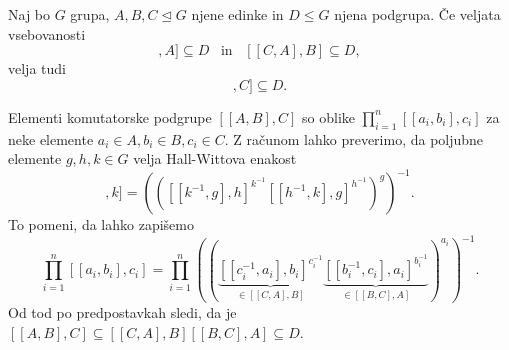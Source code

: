 \begin{lema}
\label{lem_tri_podgrupe}
Naj bo $G$ grupa, $A, B, C \trianglelefteq G$ njene edinke in $D \le G$ njena podgrupa. Če veljata vsebovanosti \begin{equation*}
[[B, C], A] \subseteq  D \,\,\, \text{ in } \,\,\, [[C, A], B]  \subseteq D,
\end{equation*}  
velja tudi \begin{equation*}
 [[A, B], C] \subseteq D.
\end{equation*}
\end{lema}
\begin{dokaz}
    Elementi komutatorske podgrupe $[[A, B], C]$ so oblike $\prod_{i = 1}^{n} [[a_i, b_i], c_i]$ za neke elemente $a_i \in A, b_{i} \in  B, c_{i} \in  C$. Z računom lahko preverimo, da poljubne elemente $g, h, k \in G$ velja Hall-Wittova enakost \begin{equation*}
[[g^{-1}, h], k] = \left(  \left(  [[k^{-1}, g], h]^{k^{-1}} [[h^{-1} , k] , g]^{h^{-1}} \right)^{g} \right)^{-1}.
\end{equation*}  
  To pomeni, da lahko zapišemo \begin{equation*}
    \prod_{i = 1}^{n} [[a_i, b_i], c_i]  = \prod_{i = 1}^{n} \left(  \left(  \underbrace{[[c_i^{-1}, a_i], b_i]^{c_i^{-1}}}_{\in [[C, A], B]}  \underbrace{[[b_i^{-1} , c_i] , a_i]^{b_i^{-1}}}_{\in [[B, C], A]}  \right)^{a_i} \right)^{-1}.
    \end{equation*}
    Od tod po predpostavkah sledi, da je $[[A, B] , C] \subseteq  [[C, A] , B] [[B, C] , A]  \subseteq D$. 
\end{dokaz}

